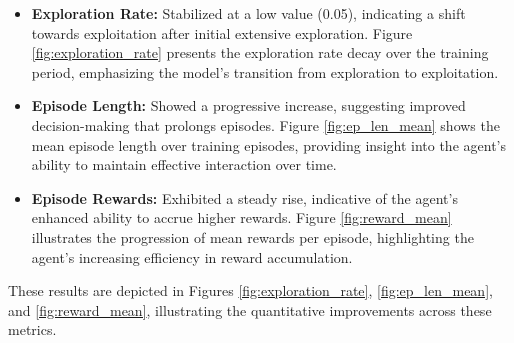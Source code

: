 \documentclass{article}
\begin{document}
\begin{itemize}
    \item \textbf{Exploration Rate:} Stabilized at a low value (0.05), indicating a shift towards exploitation after initial extensive exploration. Figure \ref{fig:exploration_rate} presents the exploration rate decay over the training period, emphasizing the model's transition from exploration to exploitation.
    \item \textbf{Episode Length:} Showed a progressive increase, suggesting improved decision-making that prolongs episodes. Figure \ref{fig:ep_len_mean} shows the mean episode length over training episodes, providing insight into the agent's ability to maintain effective interaction over time.
    \item \textbf{Episode Rewards:} Exhibited a steady rise, indicative of the agent's enhanced ability to accrue higher rewards. Figure \ref{fig:reward_mean} illustrates the progression of mean rewards per episode, highlighting the agent's increasing efficiency in reward accumulation.
\end{itemize}

These results are depicted in Figures \ref{fig:exploration_rate}, \ref{fig:ep_len_mean}, and \ref{fig:reward_mean}, illustrating the quantitative improvements across these metrics.
\end{document}
